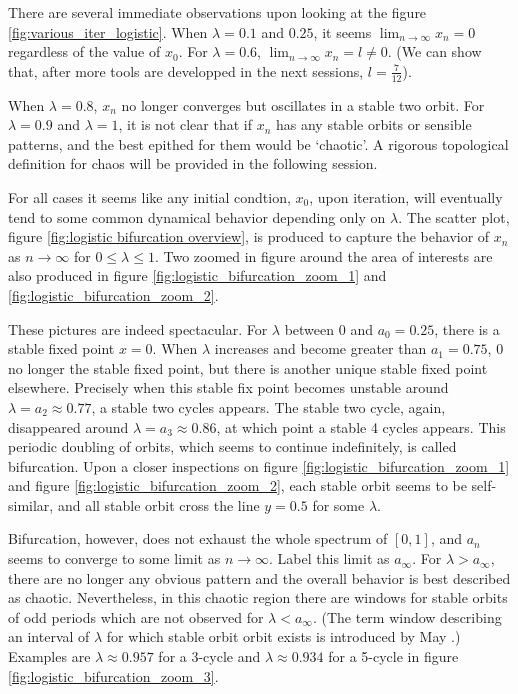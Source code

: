 There are several immediate observations upon looking at the figure \ref{fig:various_iter_logistic}.
When $\lambda = 0.1$ and $0.25$, it seems $\lim_{n \rightarrow \infty} x_n = 0$ regardless of the value of $x_0$.
For $\lambda = 0.6$, $\lim_{n \rightarrow \infty} x_n = l \neq 0$. 
(We can show that, after more tools are developped in the next sessions, $l = \frac{7}{12}$). 

When $\lambda = 0.8$, $x_n$ no longer converges but oscillates in a stable two orbit. 
For $\lambda = 0.9$ and $\lambda = 1$, it is not clear that if $x_n$ has any stable orbits or sensible patterns, and the best epithed for them would be `chaotic'.
A rigorous topological definition for chaos will be provided in the following session. 

For all cases it seems like any initial condtion, $x_0$, upon iteration, will eventually tend to some common dynamical behavior depending only on $\lambda$.
The scatter plot, figure \ref{fig:logistic bifurcation overview}, is produced to capture the behavior of $x_n$ as $n \rightarrow \infty$ for $0 \leq \lambda \leq 1$. 
Two zoomed in figure around the area of interests are also produced in figure \ref{fig:logistic_bifurcation_zoom_1} and \ref{fig:logistic_bifurcation_zoom_2}.

These pictures are indeed spectacular. 
For $\lambda$ between $0$ and $a_0 = 0.25$, there is a stable fixed point $x = 0$.
When $\lambda$ increases and become greater than $a_1 = 0.75$, $0$ no longer the stable fixed point, but there is another unique stable fixed point elsewhere.
Precisely when this stable fix point becomes unstable around $\lambda = a_2 \approx 0.77$, a stable two cycles appears.
The stable two cycle, again, disappeared around $\lambda = a_3 \approx 0.86$, at which point a stable 4 cycles appears. 
This periodic doubling of orbits, which seems to continue indefinitely, is called bifurcation. 
Upon a closer inspections on figure \ref{fig:logistic_bifurcation_zoom_1} and figure \ref{fig:logistic_bifurcation_zoom_2}, each stable orbit seems to be self-similar, and all stable orbit cross the line $y = 0.5$ for some $\lambda$.

Bifurcation, however, does not exhaust the whole spectrum of $[0,1]$, and $a_{n}$ seems to converge to some limit as $n \rightarrow \infty$. 
Label this limit as $a_{\infty}$.
For $\lambda > a_{\infty}$, there are no longer any obvious pattern and the overall behavior is best described as chaotic. 
Nevertheless, in this chaotic region there are windows for stable orbits of odd periods which are not observed for $\lambda < a_{\infty}$. (The term window describing an interval of $\lambda$ for which stable orbit orbit exists is introduced by May \cite{May_Nature}.)
Examples are $\lambda \approx 0.957$ for a 3-cycle and $\lambda \approx 0.934$ for a 5-cycle in figure \ref{fig:logistic_bifurcation_zoom_3}.

